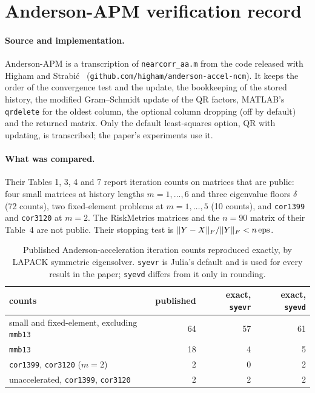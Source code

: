 \section{Anderson-APM verification record}\label{app:anderson}

\paragraph{Source and implementation.}
Anderson-APM is a transcription of \texttt{nearcorr\_aa.m} from the code
released with Higham and Strabi\'{c}~\cite{higham2016anderson}
(\texttt{github.com/higham/anderson-accel-ncm}). It keeps the order of the
convergence test and the update, the bookkeeping of the stored history, the
modified Gram--Schmidt update of the QR factors, MATLAB's \texttt{qrdelete} for
the oldest column, the optional column dropping (off by default) and the
returned matrix. Only the default least-squares option, QR with updating, is
transcribed; the paper's experiments use it.

\paragraph{What was compared.}
Their Tables 1, 3, 4 and 7 report iteration counts on matrices that are
public: four small matrices at history lengths $m=1,\dots,6$ and three
eigenvalue floors $\delta$ (72 counts), two fixed-element problems at
$m=1,\dots,5$ (10 counts), and \texttt{cor1399} and \texttt{cor3120} at $m=2$.
The RiskMetrics matrices and the $n=90$ matrix of their Table~4 are not public.
Their stopping test is $\lVert Y-X\rVert_F/\lVert Y\rVert_F<n\,\mathrm{eps}$.

\begin{table}[h]
\centering
\caption{Published Anderson-acceleration iteration counts reproduced exactly,
by LAPACK symmetric eigensolver. \texttt{syevr} is Julia's default and is used
for every result in the paper; \texttt{syevd} differs from it only in
rounding.}
\label{tab:anderson-verify}
\small
\begin{tabular}{lrrr}
\toprule
counts & published & exact, \texttt{syevr} & exact, \texttt{syevd}\\
\midrule
small and fixed-element, excluding \texttt{mmb13} & 64 & 57 & 61\\
\texttt{mmb13} & 18 & 4 & 5\\
\texttt{cor1399}, \texttt{cor3120} ($m=2$) & 2 & 0 & 2\\
unaccelerated, \texttt{cor1399}, \texttt{cor3120} & 2 & 2 & 2\\
\bottomrule
\end{tabular}
\end{table}

